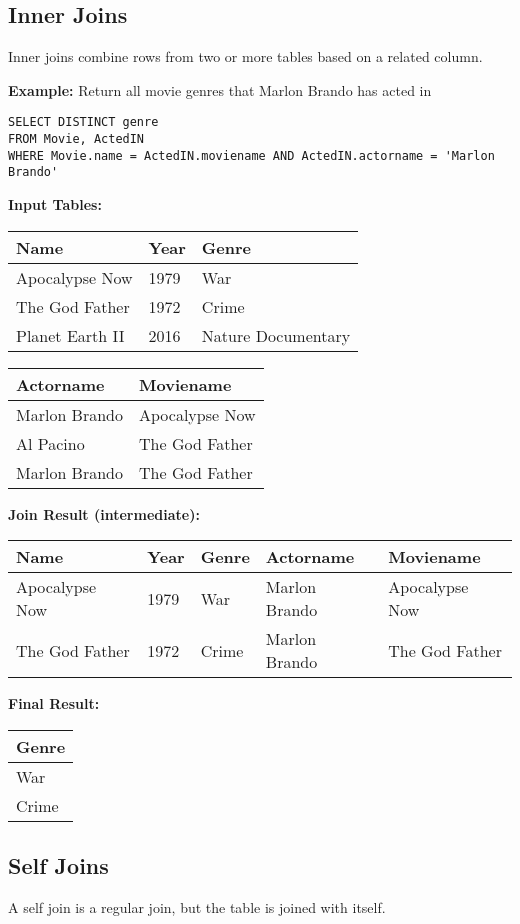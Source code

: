 \documentclass{article}
\begin{document}
\subsection*{Inner Joins}
Inner joins combine rows from two or more tables based on a related column.

\textbf{Example:} Return all movie genres that Marlon Brando has acted in

\begin{verbatim}
SELECT DISTINCT genre
FROM Movie, ActedIN
WHERE Movie.name = ActedIN.moviename AND ActedIN.actorname = 'Marlon Brando'
\end{verbatim}

\textbf{Input Tables:}
\begin{tabular}{lll}
\hline
Name & Year & Genre \\
\hline
Apocalypse Now & 1979 & War \\
The God Father & 1972 & Crime \\
Planet Earth II & 2016 & Nature Documentary \\
\hline
\end{tabular}

\begin{tabular}{ll}
\hline
Actorname & Moviename \\
\hline
Marlon Brando & Apocalypse Now \\
Al Pacino & The God Father \\
Marlon Brando & The God Father \\
\hline
\end{tabular}

\textbf{Join Result (intermediate):}
\begin{tabular}{lllll}
\hline
Name & Year & Genre & Actorname & Moviename \\
\hline
Apocalypse Now & 1979 & War & Marlon Brando & Apocalypse Now \\
The God Father & 1972 & Crime & Marlon Brando & The God Father \\
\hline
\end{tabular}

\textbf{Final Result:}
\begin{tabular}{l}
\hline
Genre \\
\hline
War \\
Crime \\
\hline
\end{tabular}

\subsection*{Self Joins}
A self join is a regular join, but the table is joined with itself.
\end{document}
